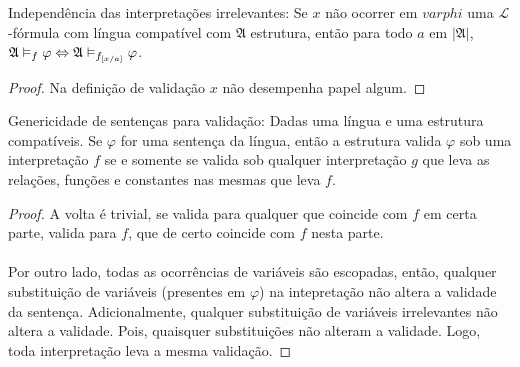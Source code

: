     \begin{lemma}{Independência das interpretações irrelevantes:}
        Se $x$ não ocorrer em $varphi$ uma $\mathcal{L}$-fórmula
        com língua compatível com $\mathfrak{A}$ estrutura, então
        para todo $a$ em $|\mathfrak{A}|$, $\mathfrak{A}\vDash_{f}
        \varphi\Leftrightarrow\mathfrak{A}\vDash_{f_{[x\slash{a}]}}\varphi$.
    \end{lemma}
    \begin{proof}
        Na definição de validação $x$ não desempenha papel algum.\eop
    \end{proof}

    \begin{theorem}{Genericidade de sentenças para validação:}
        Dadas uma língua e uma estrutura compatíveis. Se $\varphi$ for uma 
        sentença da língua, então a estrutura valida $\varphi$ sob uma 
        interpretação $f$ se e somente se valida sob qualquer interpretação 
        $g$ que leva as relações, funções e constantes nas mesmas que leva 
        $f$.
    \end{theorem}
    \begin{proof}
        A volta é trivial, se valida para qualquer que coincide com $f$ em 
        certa parte, valida para $f$, que de certo coincide com $f$ nesta 
        parte.
        \paragraph{}
            Por outro lado, todas as ocorrências de variáveis são escopadas,
            então, qualquer substituição de variáveis (presentes em $\varphi$) 
            na intepretação não altera a validade da sentença. Adicionalmente,
            qualquer substituição de variáveis irrelevantes não altera a 
            validade. Pois, quaisquer substituições não alteram a validade.
            Logo, toda interpretação leva a mesma validação.\eop
    \end{proof}

